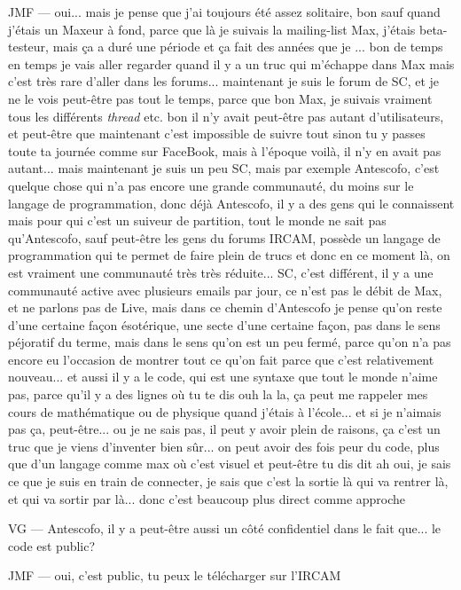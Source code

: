 JMF — oui... mais je pense que j'ai toujours été assez solitaire, bon sauf quand j'étais un Maxeur à fond, parce que là je suivais la mailing-list Max, j'étais beta-testeur, mais ça a duré une période et ça fait des années que je ... bon de temps en temps je vais aller regarder quand il y a un truc qui m'échappe dans Max mais c'est très rare d'aller dans les forums... maintenant je suis le forum de SC, et je ne le vois peut-être pas tout le temps, parce que bon Max, je suivais vraiment tous les différents \textit{thread} etc. bon il n'y avait peut-être pas autant d'utilisateurs, et peut-être que maintenant c'est impossible de suivre tout sinon tu y passes toute ta journée comme sur FaceBook, mais à l'époque voilà, il n'y en avait pas autant... mais maintenant je suis un peu SC, mais par exemple Antescofo, c'est quelque chose qui n'a pas encore une grande communauté, du moins sur le langage de programmation, donc déjà Antescofo, il y a des gens qui le connaissent mais pour qui c'est un suiveur de partition, tout le monde ne sait pas qu'Antescofo, sauf peut-être les gens du forums IRCAM, possède un langage de programmation qui te permet de faire plein de trucs et donc en ce moment là, on est vraiment une communauté très très réduite... SC, c'est différent, il y a une communauté active avec plusieurs emails par jour, ce n'est pas le débit de Max, et ne parlons pas de Live, mais dans ce chemin d'Antescofo je pense qu'on reste d'une certaine façon ésotérique, une secte d'une certaine façon, pas dans le sens péjoratif du terme, mais dans le sens qu'on est un peu fermé, parce qu'on n'a pas encore eu l'occasion de montrer tout ce qu'on fait parce que c'est relativement nouveau... et aussi il y a le code, qui est une syntaxe que tout le monde n'aime pas, parce qu'il y a des lignes où tu te dis ouh la la, ça peut me rappeler mes cours de mathématique ou de physique quand j'étais à l'école... et si je n'aimais pas ça, peut-être... ou je ne sais pas, il peut y avoir plein de raisons, ça c'est un truc que je viens d'inventer bien sûr... on peut avoir des fois peur du code, plus que d'un langage comme max où c'est visuel et peut-être tu dis dit ah oui, je sais ce que je suis en train de connecter, je sais que c'est la sortie là qui va rentrer là, et qui va sortir par là... donc c'est beaucoup plus direct comme approche 

VG — Antescofo, il y a peut-être aussi un côté confidentiel dans le fait que... le code est public? 

JMF — oui, c'est public, tu peux le télécharger sur l'IRCAM  

